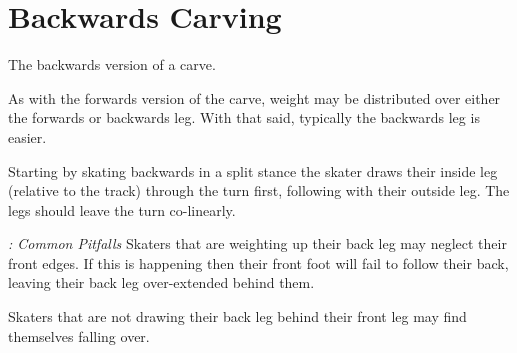 \section{Backwards Carving}

\label{sec:sticky/backwards_carves}

The backwards version of a carve.

As with the forwards version of the carve, weight may be distributed over either the forwards or backwards leg. With that said, typically the backwards leg is easier.  

Starting by skating backwards in a split stance the skater draws their inside leg (relative to the track) through the turn first, following with their outside leg.   
The legs should leave the turn co-linearly. 


{\it: Common Pitfalls}
Skaters that are weighting up their back leg may neglect their front edges. If this is happening then their front foot will fail to follow their back, leaving their back leg over-extended behind them.   


Skaters that are not drawing their back leg behind their front leg may find themselves falling over.  


